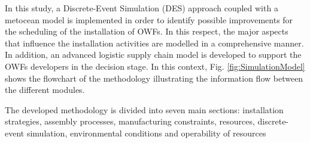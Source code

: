 In this study, a Discrete-Event Simulation (DES) approach coupled with a metocean model is implemented in order to identify possible improvements for the scheduling of the installation of OWFs. In this respect, the major aspects that influence the installation activities are modelled in a comprehensive manner. In addition, an advanced logistic supply chain model is developed to support the OWFs developers in the decision stage. In this context, Fig. \ref{fig:SimulationModel} shows the flowchart of the methodology illustrating the information flow between the different modules.

The developed methodology is divided into seven main sections: installation strategies, assembly processes, manufacturing constraints, resources, discrete-event simulation, environmental conditions and operability of resources
